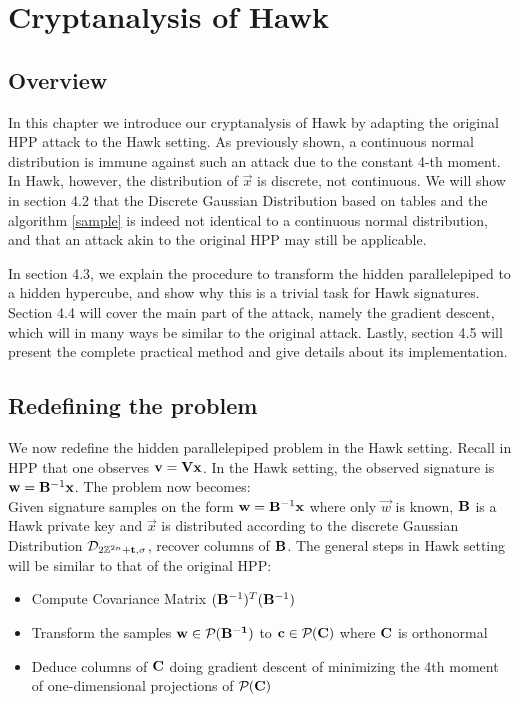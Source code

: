 \chapter{Cryptanalysis of Hawk}

\section{Overview}
In this chapter we introduce our cryptanalysis of Hawk by adapting the original HPP attack to the Hawk setting.
As previously shown, a continuous normal distribution is immune against such an attack due to the constant 4-th moment. In Hawk, however, the distribution of $\vec{x}$ is discrete, not continuous.
We will show in section 4.2 that the Discrete Gaussian Distribution based on tables and the algorithm \ref{sample} is indeed not identical to a continuous normal distribution, and that an attack akin to the original HPP may still be applicable.

In section 4.3, we explain the procedure to transform the hidden parallelepiped to a hidden hypercube, and show why this is a trivial task for Hawk signatures.
Section 4.4 will cover the main part of the attack, namely the gradient descent, which will in many ways be similar to the original attack.
Lastly, section 4.5 will present the complete practical method and give details about its implementation.

\section{Redefining the problem}

We now redefine the hidden parallelepiped problem in the Hawk setting.
Recall in HPP that one observes $\mathbf{v} = \mathbf{V} \mathbf{x}$. In the Hawk setting, the observed signature is $\mathbf{w} = \mathbf{B}^{-1} \mathbf{x}$. 
The problem now becomes: \\
Given signature samples on the form $\mathbf{w} = \mathbf{B}^{-1} \mathbf{x}$ where only $\vec{w}$ is known, $\mathbf{B}$ is a Hawk private key and $\vec{x}$ is distributed according to the discrete Gaussian Distribution $\mathcal{D}_{2\mathbb{Z}^{2n} + \mathbf{t}, \sigma}$,
recover columns of $\mathbf{B}$.
The general steps in Hawk setting will be similar to that of the original HPP:
\begin{itemize}
    \item Compute Covariance Matrix $(\mathbf{B}^{-1})^T (\mathbf{B}^{-1})$
    \item Transform the samples $\mathbf{w} \in \mathcal{P}_{}(\mathbf{\mathbf{B}^{-1}})$ to $\mathbf{c} \in \mathcal{P}_{}(\mathbf{C})$ where $\mathbf{C}$ is orthonormal
    \item Deduce columns of $\mathbf{C}$ doing gradient descent of minimizing the 4th moment of one-dimensional projections of $\mathcal{P}_{}(\mathbf{C})$
\end{itemize}


